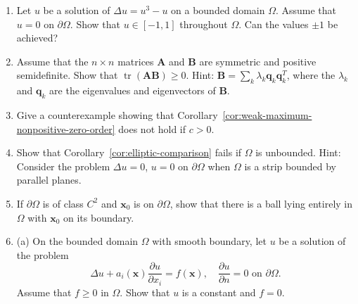 \begin{enumerate}[label=\thesection.\arabic*.,ref=\thesection.\arabic*,start=1,series=book-problems]

\item\label{ex:semilinear-cubic-maximum-bound} Let $u$ be a solution of $\Delta u=u^3-u$ on a bounded domain $\Omega$. Assume that $u=0$ on $\partial\Omega$. Show that $u\in[-1,1]$ throughout $\Omega$. Can the values $\pm1$ be achieved?

\item\label{ex:trace-positive-semidefinite-product} Assume that the $n\times n$ matrices $\bm{A}$ and $\bm{B}$ are symmetric and positive semidefinite. Show that $\operatorname{tr}(\bm{A}\bm{B})\geq0$. Hint: $\bm{B}=\sum_k\lambda_k\bm{q}_k\bm{q}_k^T$, where the $\lambda_k$ and $\bm{q}_k$ are the eigenvalues and eigenvectors of $\bm{B}$.

\item\label{ex:weak-maximum-positive-zero-order-counterexample} Give a counterexample showing that Corollary~\ref{cor:weak-maximum-nonpositive-zero-order} does not hold if $c>0$.

\item\label{ex:unbounded-elliptic-comparison-counterexample} Show that Corollary~\ref{cor:elliptic-comparison} fails if $\Omega$ is unbounded. Hint: Consider the problem $\Delta u=0$, $u=0$ on $\partial\Omega$ when $\Omega$ is a strip bounded by parallel planes.

\item\label{ex:interior-tangent-ball} If $\partial\Omega$ is of class $C^2$ and $\bm{x}_0$ is on $\partial\Omega$, show that there is a ball lying entirely in $\Omega$ with $\bm{x}_0$ on its boundary.

\item\label{ex:drift-neumann-adjoint-solvability} (a) On the bounded domain $\Omega$ with smooth boundary, let $u$ be a solution of the problem
\begin{equation}\label{eq:drift-neumann-problem}
\Delta u+a_i(\bm{x})\dfrac{\partial u}{\partial x_i}=f(\bm{x}),\quad\dfrac{\partial u}{\partial n}=0\text{ on }\partial\Omega.
\end{equation}
Assume that $f\geq0$ in $\Omega$. Show that $u$ is a constant and $f=0$.


\end{enumerate}

